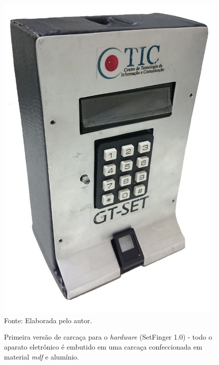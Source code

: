 \begin{figure}[!t]
  \begin{center}
  \caption{Primeira versão de carcaça para o \textit{hardware} (SetFinger 1.0) - todo o aparato eletrônico é embutido em uma carcaça confeccionada em material \textit{mdf} e alumínio.}
  \includegraphics[scale=0.8]{figuras/cap4/setfinger_v1_1.jpg}\\
  Fonte: Elaborada pelo autor.
  \label{setfinger_v1_1}
  \end{center}
  \end{figure}
  
